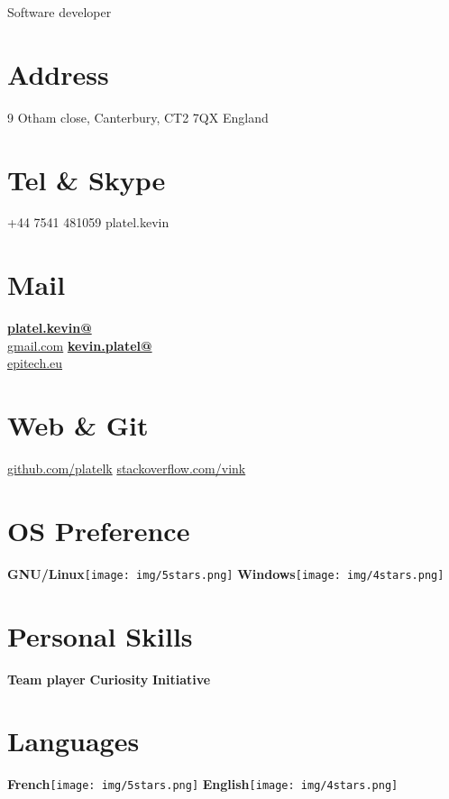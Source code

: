 \documentclass[]{friggeri-cv}
\begin{document}
      {Software developer}
      

\begin{aside}
  \section{Address}
    9 Otham close,
    Canterbury, CT2 7QX
    England
    ~
  \section{Tel \& Skype}
    +44 7541 481059
    platel.kevin
    ~
  \section{Mail}
    \href{mailto:platel.kevin@gmail.com}{\textbf{platel.kevin@}\\gmail.com}
    \href{mailto:kevin.platel@epitech.eu}{\textbf{kevin.platel@}\\epitech.eu}
    ~
  \section{Web \& Git}
    \href{https://github.com/platelk}{github.com/platelk}
    \href{http://stackoverflow.com/users/3676180/vink}{stackoverflow.com/vink}
    ~
  \section{OS Preference}
    \textbf{GNU/Linux}\texttt{[image: img/5stars.png]}
    \textbf{Windows}\texttt{[image: img/4stars.png]}
    ~
  \section{Personal Skills}
    \textbf{Team player}
    \textbf{Curiosity}
    \textbf{Initiative}
    ~
  \section{Languages}
  \textbf{French}\texttt{[image: img/5stars.png]}
  \textbf{English}\texttt{[image: img/4stars.png]}
\end{aside}
\end{document}
